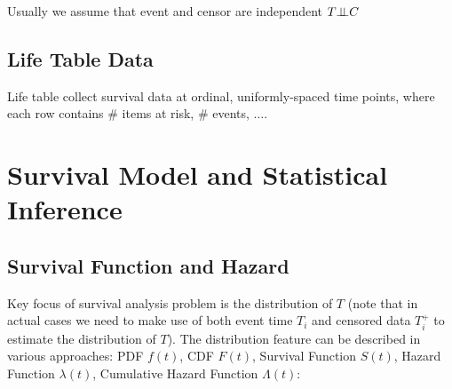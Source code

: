 Usually we assume that event and censor are independent $ T\bot\!\!\!\bot C $

\subsection{Life Table Data}
Life table collect survival data at ordinal, uniformly-spaced time points, where each row contains \# items at risk, \# events, $ \ldots  $.


\section{Survival Model and Statistical Inference}
\subsection{Survival Function and Hazard}
Key focus of survival analysis problem is the distribution of $ T $ (note that in actual cases we need to make use of both event time $ T_i $ and censored data $ T^+_i $ to estimate the distribution of $ T $). The distribution feature can be described in various approaches: PDF $ f(t) $, CDF $ F(t) $, Survival Function $ S(t) $, Hazard Function $ \lambda (t) $, Cumulative Hazard Function $ \Lambda (t) $:
